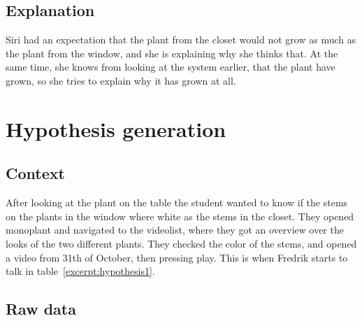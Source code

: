 \subsection{Explanation}
Siri had an expectation that the plant from the closet would not grow as much as the plant from the window, and she is explaining why she thinks that. At the same time, she knows from looking at the system earlier, that the plant have grown, so she tries to explain why it has grown at all. 


\section{Hypothesis generation}

\subsection{Context}
After looking at the plant on the table the student wanted to know if the stems on the plants in the window where white as the stems in the closet. They opened monoplant and navigated to the videolist, where they got an overview over the looks of the two different plants. They checked the color of the stems, and opened a video from 31th of October, then pressing play. This is when Fredrik starts to talk in table~\ref{excerpt:hypothesis1}.



\subsection{Raw data}


